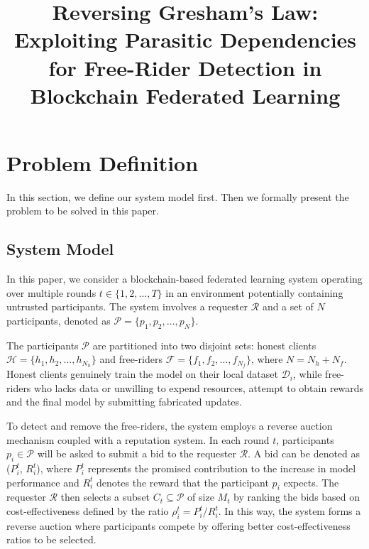 \documentclass[conference]{IEEEtran}
\begin{document}
\title{Reversing Gresham's Law: Exploiting Parasitic Dependencies for Free-Rider Detection in Blockchain Federated Learning}

\author{
}
\maketitle




\section{Problem Definition}
\label{sec:problem_definition}
In this section, we define our system model first. Then we formally present the problem to be solved in this paper.

\subsection{System Model}
\label{sec:system_model}
In this paper, we consider a blockchain-based federated learning system operating over multiple rounds $t \in \{1, 2, \dots, T\}$ in an environment potentially containing untrusted participants.
The system involves a requester $\mathcal{R}$ and a set of $N$ participants, denoted as $\mathcal{P} = \{p_1, p_2, \dots, p_N\}$.

The participants $\mathcal{P}$ are partitioned into two disjoint sets: honest clients $\mathcal{H} = \{h_1, h_2, \dots, h_{N_h}\}$ and free-riders $\mathcal{F} = \{f_1, f_2, \dots, f_{N_f}\}$, where $N = N_h + N_f$.
Honest clients genuinely train the model on their local dataset $\mathcal{D}_i$, while free-riders who lacks data or unwilling to expend resources, attempt to obtain rewards and the final model by submitting fabricated updates.

To detect and remove the free-riders, the system employs a reverse auction mechanism coupled with a reputation system. 
In each round $t$, participants $p_i \in \mathcal{P}$ will be asked to submit a bid to the requester $\mathcal{R}$. 
A bid can be denoted as ($P_i^t$, $R_i^t$), where $P_i^t$ represents the promised contribution to the increase in model performance and $R_i^t$ denotes the reward that the participant $p_i$ expects.
The requester $\mathcal{R}$ then selects a subset $C_t \subseteq \mathcal{P}$ of size $M_t$ by ranking the bids based on cost-effectiveness defined by the ratio $\rho_i^t = P_i^t / R_i^t$.
In this way, the system forms a reverse auction where participants compete by offering better cost-effectiveness ratios to be selected.
\end{document}
